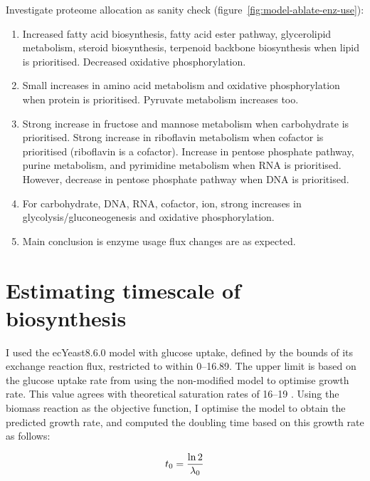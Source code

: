 Investigate proteome allocation as sanity check (figure~\ref{fig:model-ablate-enz-use}):

\begin{enumerate}
  \item Increased fatty acid biosynthesis, fatty acid ester pathway, glycerolipid metabolism, steroid biosynthesis, terpenoid backbone biosynthesis when lipid is prioritised.
        Decreased oxidative phosphorylation.
  \item Small increases in amino acid metabolism and oxidative phosphorylation when protein is prioritised.
        Pyruvate metabolism increases too.
  \item Strong increase in fructose and mannose metabolism when carbohydrate is prioritised.
        Strong increase in riboflavin metabolism when cofactor is prioritised (riboflavin is a cofactor).
        Increase in pentose phosphate pathway, purine metabolism, and pyrimidine metabolism when RNA is prioritised.
        However, decrease in pentose phosphate pathway when DNA is prioritised.
  \item For carbohydrate, DNA, RNA, cofactor, ion, strong increases in glycolysis/gluconeogenesis and oxidative phosphorylation.
  \item Main conclusion is enzyme usage flux changes are as expected.
\end{enumerate}

\section{Estimating timescale of biosynthesis}
\label{sec:model-timescale}

I used the ecYeast8.6.0 model with glucose uptake, defined by the bounds of its exchange reaction flux, restricted to within \SIrange{0}{16.89}{\mmolgdw}.
The upper limit is based on the glucose uptake rate from using the non-modified model to optimise growth rate.
This value agrees with theoretical saturation rates of \SIrange{16}{19}{\mmolgdw} \parencite{blankTCACycleActivity2004}.
Using the biomass reaction as the objective function, I optimise the model to obtain the predicted growth rate, and computed the doubling time based on this growth rate as follows:

\begin{equation}
  t_{0} = \frac{\ln 2}{\lambda_{0}}
  \label{eq:model-doubling-time}
\end{equation}

